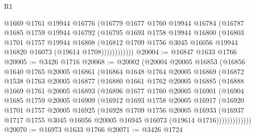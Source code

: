 \begin{lexlean}{R1}
\begin{coremodule}
                @1669
                @1761
                @19944
                @16776
                (@16779
                  @1677
                  @1760
                  @19944
                  @16784
                  (@16787
                    @1685
                    @1759
                    @19944
                    @16792
                    (@16795
                      @1693
                      @1758
                      @19944
                      @16800
                      (@16803
                        @1701
                        @1757
                        @19944
                        @16808
                        (@16812
                          @1709
                          @1756
                          @3045
                          @16056
                          @19944
                          @16820
                          @16073
                          (@19614 @1708))))))))))))
@20004 := @16847 @1633 @1766
@20005 := @3426 @1716
@20068 := @20002
    (@20004
      @20005
      @16853
      (@16856
        @1640
        @1765
        @20005
        @16861
        (@16864
          @1648
          @1764
          @20005
          @16869
          (@16872
            @1538
            @1763
            @20005
            @16877
            (@16880
              @1661
              @1762
              @20005
              @16885
              (@16888
                @1669
                @1761
                @20005
                @16893
                (@16896
                  @1677
                  @1760
                  @20005
                  @16901
                  (@16904
                    @1685
                    @1759
                    @20005
                    @16909
                    (@16912
                      @1693
                      @1758
                      @20005
                      @16917
                      (@16920
                        @1701
                        @1757
                        @20005
                        @16925
                        (@16928
                          @1709
                          @1756
                          @20005
                          @16933
                          (@16937
                            @1717
                            @1755
                            @3045
                            @16056
                            @20005
                            @16945
                            @16073
                            (@19614 @1716)))))))))))))
@20070 := @16973 @1633 @1766
@20071 := @3426 @1724

\end{coremodule}
\end{lexlean}
